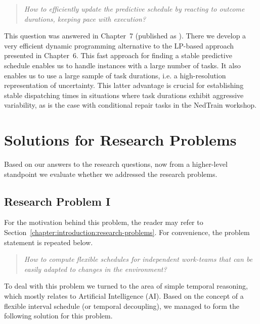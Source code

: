 	\begin{quote}
	\emph{How to efficiently update the predictive schedule by reacting to outcome durations, keeping pace with execution?}
	\end{quote}

	This question was answered in Chapter~7 (published as \cite{mountakis2017stochastic}).
	There we develop a very efficient dynamic programming alternative to the LP-based approach presented in Chapter~6.
	This fast approach for finding a stable predictive schedule enables us to handle instances with a large number of tasks.
	It also enables us to use a large sample of task durations, i.e. a high-resolution representation of uncertainty.
	This latter advantage is crucial for establishing stable dispatching times in situations where task durations exhibit aggressive variability,
	as is the case with conditional repair tasks in the NedTrain workshop.

\section{Solutions for Research Problems}

Based on our answers to the research questions, 
now from a higher-level standpoint we evaluate whether we addressed the research problems.

\subsection{Research Problem I}

 	For the motivation behind this problem, the reader may refer to Section~\ref{chapter:introduction:research-problems}.
 	For convenience, the problem statement is repeated below.
 	
	\begin{quote}
		\emph{How to compute flexible schedules for independent work-teams that can be easily adapted to changes in the environment?}
	\end{quote}
	
	To deal with this problem we turned to the area of simple temporal reasoning,
	which mostly relates to Artificial Intelligence (AI).
	Based on the concept of a flexible interval schedule (or temporal decoupling),
	we managed to form the following solution for this problem.
	
